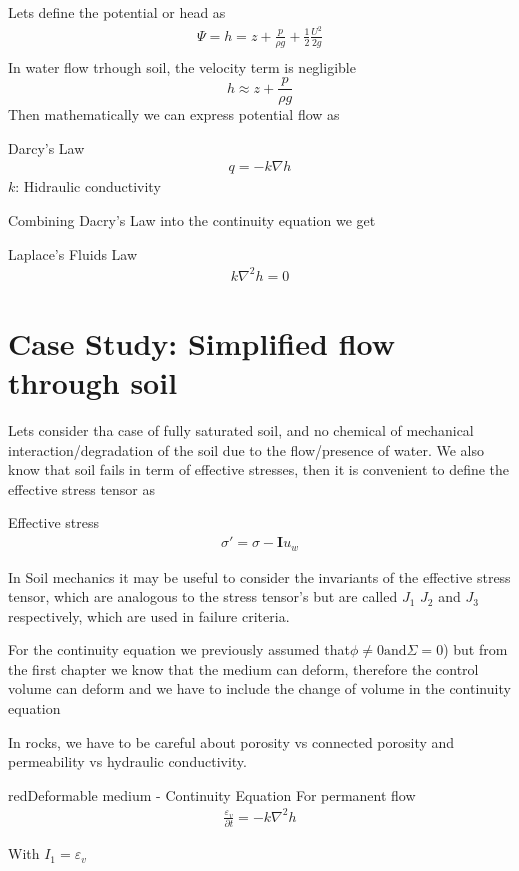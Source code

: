 \documentclass[a4paper, 11pt,article,oneside]{memoir}%
\begin{document}
Lets define the potential or head as
\begin{gather*}
\Psi=h=z+\frac{p}{\rho g}+\frac{1}{2}\frac{U^2}{2g}\\
\end{gather*}
In water flow trhough soil, the velocity term is negligible
$$ h\approx z+\frac{p}{\rho g}$$
Then mathematically we can express potential flow as 
\begin{eqbox2}{}{Darcy's Law}
\begin{gather*}
q=-k\nabla h
\end{gather*}
$k$: Hidraulic conductivity 
\end{eqbox2} 
Combining Dacry's Law into the continuity equation we get 
\begin{eqbox2}{}{Laplace's Fluids Law}
\begin{gather*}
k\nabla^2h=0
\end{gather*}
\end{eqbox2}
\newpage
\section{Case Study: Simplified flow through soil}
Lets consider tha case of fully saturated soil, and no chemical of mechanical interaction/degradation of the soil due to the flow/presence of water. We also know that soil fails in term of effective stresses, then it is convenient to define the effective stress tensor as
\begin{eqbox2}{}{Effective stress} 
\begin{align*}
\sigma'=\sigma-\boldsymbol{I}u_w
\end{align*}
\end{eqbox2}
In Soil mechanics it may be  useful to consider the invariants of the effective stress tensor, which are analogous to the stress tensor's but are called $J_1$ $J_2$ and $J_3$ respectively, which are used in failure criteria\cite{ICE2614}.

For the continuity equation we previously assumed that$\phi\neq0 \text{and} \Sigma=0$) but from the first chapter we know that the medium can deform, therefore the control volume can deform and we have to include the change of volume in the continuity equation
\begin{note}
In rocks, we have to be careful about porosity vs connected porosity and permeability vs hydraulic conductivity.\end{note} 
\begin{eqbox2}{red}{Deformable medium - Continuity Equation}
For permanent flow
\begin{align*}
\frac{\varepsilon_v}{\partial t}=-k \nabla^2 h
\end{align*}
\end{eqbox2}
With 
$I_1=\varepsilon_v$
\newpage
\end{document}
